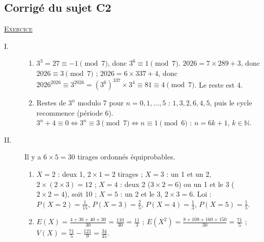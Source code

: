 \begin{corrige}
\subsection{Corrig\'e du sujet C2}
\noindent \underline{\textsc{Exercice}}
\begin{description}
\item[I.] \begin{enumerate}
      \item $3^3 = 27 \equiv -1 \pmod 7$, donc $3^6 \equiv 1 \pmod 7$. $2026 = 7 \times 289 + 3$, donc $2026 \equiv 3 \pmod 7$ ;
            $2026 = 6 \times 337 + 4$, donc $2026^{2026} \equiv 3^{2026} = (3^6)^{337} \times 3^4 \equiv 81 \equiv 4 \pmod 7$. Le reste est 4.
      \item Restes de $3^n$ modulo 7 pour $n = 0, 1, \ldots, 5$ : $1, 3, 2, 6, 4, 5$, puis le cycle recommence (p\'eriode 6).
            $3^n + 4 \equiv 0 \iff 3^n \equiv 3 \pmod 7 \iff n \equiv 1 \pmod 6$ : $n = 6k + 1$, $k \in \mathbb{N}$.
      \end{enumerate}
\item[II.] Il y a $6 \times 5 = 30$ tirages ordonn\'es \'equiprobables.
      \begin{enumerate}
      \item $X = 2$ : deux 1, $2 \times 1 = 2$ tirages ; $X = 3$ : un 1 et un 2, $2 \times (2 \times 3) = 12$ ; $X = 4$ : deux 2 ($3 \times 2 = 6$)
            ou un 1 et le 3 ($2 \times 2 = 4$), soit 10 ; $X = 5$ : un 2 et le 3, $2 \times 3 = 6$.
            Loi : $P(X = 2) = \frac{1}{15}$, $P(X = 3) = \frac{2}{5}$, $P(X = 4) = \frac{1}{3}$, $P(X = 5) = \frac{1}{5}$.
      \item $E(X) = \frac{4 + 36 + 40 + 30}{30} = \frac{110}{30} = \frac{11}{3}$ ; $E(X^2) = \frac{8 + 108 + 160 + 150}{30} = \frac{71}{5}$ ;
            $V(X) = \frac{71}{5} - \frac{121}{9} = \frac{34}{45}$.
      \end{enumerate}
\end{description}


\end{corrige}
